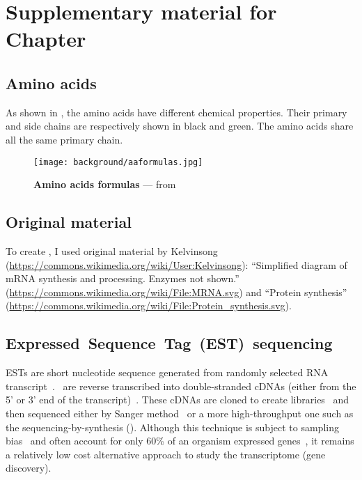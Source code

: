 \chapter{Suppl\texorpdfstring{ementary}{.} material for Chap\texorpdfstring{ter}{.} }%
\label{ch:SupplBack}

\section{Amino acids}\label{sec:aa}

As shown in ,
the amino acids have different chemical properties.
Their primary and side chains are respectively shown in black and green.
The amino acids share all the same primary chain.

\begin{figure}[htpb]
    \texttt{[image: background/aaformulas.jpg]}\centering
    \caption[Amino acids formulas]{\label{fig:aaformulas}%
    \textbf{Amino acids formulas} --- from \citet{Morris2016-qv}}
\end{figure}

\section{Original material}\label{sec:kelvinsong}
\vspace{-5mm}
To create ,
I used original material
by Kelvinsong (\href{https://commons.wikimedia.org/wiki/User:Kelvinsong}{https://commons.wikimedia.org/wiki/User:Kelvinsong}):
\enquote{Simplified diagram of mRNA synthesis and processing. Enzymes not shown.}
(\href{https://commons.wikimedia.org/wiki/File:MRNA.svg}{https://commons.wikimedia.org/wiki/File:MRNA.svg})
and
\enquote{Protein synthesis} (\href{https://commons.wikimedia.org/wiki/File:Protein\_synthesis.svg}%
{https://commons.wikimedia.org/wiki/File:Protein\_synthesis.svg}).

\vspace{-3mm}
\section[EST-sequencing]{Expressed~Sequence~Tag~(EST)~sequencing}\label{sec:EST}
\vspace{-5mm}
\glspl{EST} are short nucleotide sequence generated
from randomly selected \gls{RNA} transcript~.
\mRNAs\ are reverse transcribed into double-stranded \glspl{cDNA}
(either from the 5' or 3' end of the transcript)~.
These \glspl{cDNA} are cloned to create libraries~
and then sequenced either by Sanger method~ or
a more high-throughput one such as
the sequencing-by-synthesis ().
Although this technique is subject to sampling bias~ and
often account for only 60\% of an organism expressed genes~,
it remains a relatively low cost alternative approach to study the transcriptome
(gene discovery).


